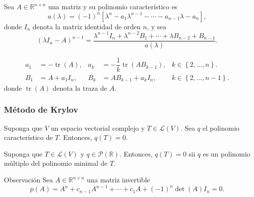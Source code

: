 \begin{frame}
	Sea $A\in\mathbb{R}^{n\times n}$ una matriz y su polinomio
	característico es
	\begin{equation*}
		a\left(\lambda\right)=
		\left(-1\right)^{n}
		\left[
		\lambda^{n}-a_{1}\lambda^{n-1}-\cdots-a_{n-1}\lambda-a_{n}
		\right],
	\end{equation*}
	donde $I_{n}$ denota la matriz identidad de orden $n$, y sea
	\begin{equation*}
		{\left(\lambda I_{n}-A\right)}^{n-1}=
		\dfrac{
		\lambda^{n-1}I_{n}+
		\lambda^{n-2}B_{1}+
		\cdots+
		\lambda B_{n-2}+
		B_{n-1}
		}{a\left(\lambda\right)}.
	\end{equation*}

	\begin{align*}
		a_{1} & =-\operatorname{tr}\left(A\right),                    &
		a_{k} & =-\dfrac{1}{k}\operatorname{tr}\left(AB_{k-1}\right),
		      & k\in\left\{2,\dotsc,n\right\}.                          \\
		B_{1} & = A + a_{1}I_{n},                                     &
		B_{k} & =AB_{k-1}+a_{k}I_{n},
		      & k\in\left\{2,\dotsc,n-1\right\}.
	\end{align*}
	donde $\operatorname{tr}\left(A\right)$ denota la traza de $A$.
\end{frame}

\begin{frame}
	\frametitle{Método de Krylov}

	\begin{theorem}
		Suponga que $V$ un espacio vectorial complejo y
		$T\in\mathcal{L}\left(V\right)$.
		Sea $q$ el polinomio característico de $T$.
		Entonces, $q\left(T\right)=0$.
	\end{theorem}

	\begin{theorem}
		Suponga que $T\in\mathcal{L}\left(V\right)$ y
		$q\in\mathcal{P}\left(\mathbb{R}\right)$.
		Entonces, $q\left(T\right)=0$ sii $q$ es un polinomio múltiplo
		del polinomio minimal de $T$.
	\end{theorem}

	\begin{block}{Observación}
		Sea $A\in\mathbb{R}^{n\times n}$ una matriz invertible
		\begin{equation*}
			p\left(A\right)=
			A^{n}+
			c_{n-1}A^{n-1}+
			\cdots+
			c_{1}A+
			{\left(-1\right)}^{n}
			\det\left(A\right)I_{n}=
			0.
		\end{equation*}
	\end{block}
\end{frame}

